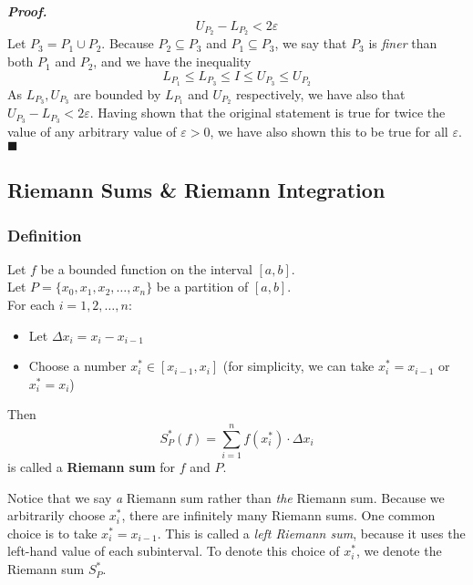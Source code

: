 \documentclass[10pt]{article}
\newenvironment{definition}[1][]{\begin{tcolorbox}[colframe=_orange,colback=_orange2,title=Definition. \ifthenelse{\isempty{#1}}{}{(#1)}
]}{\end{tcolorbox}}
\newenvironment{proof}{\par\textit{\textbf{Proof.}}}{\hfill$\blacksquare$}
\begin{document}
\begin{proof}
    $$
        U_{P_2}-L_{P_2}<2\varepsilon
    $$
    Let $P_3=P_1\cup P_2$. Because $P_2\subseteq P_3$ and $P_1\subseteq P_3$, we say that $P_3$ is \textit{finer} than both $P_1$ and $P_2$, and we have the inequality
    $$
        L_{P_1}\leq L_{P_3} \leq I \leq U_{P_3} \leq U_{P_2}
    $$
    As $L_{P_3},U_{P_3}$ are bounded by $L_{P_1}$ and $U_{P_2}$ respectively, we have also that $U_{P_3}-L_{P_3}<2\varepsilon$. Having shown that the original statement is true for twice the value of any arbitrary value of $\varepsilon>0$, we have also shown this to be true for all $\varepsilon$.
\end{proof}
\subsection{Riemann Sums \& Riemann Integration}
\subsubsection{Definition}
\begin{definition}
    Let $f$ be a bounded function on the interval $[a,b]$. \\
    Let $P=\{x_0,x_1,x_2,\dots,x_n\}$ be a partition of $[a,b]$. \\
    For each $i=1,2,\dots,n$:
    \begin{itemize}
        \item Let $\Delta x_i=x_i-x_{i-1}$
        \item Choose a number $x_i^*\in[x_{i-1},x_i]$ (for simplicity, we can take $x_i^*=x_{i-1}$ or $x_i^*=x_i$)
    \end{itemize}
    Then
    $$
        S_P^*(f)=\sum_{i=1}^nf(x_i^*)\cdot\Delta x_i
    $$
    is called a \textbf{Riemann sum} for $f$ and $P$.
\end{definition}
Notice that we say \textit{a} Riemann sum rather than \textit{the} Riemann sum. Because we arbitrarily choose $x_i^*$, there are infinitely many Riemann sums. One common choice is to take $x_i^*=x_{i-1}$. This is called a \textit{left Riemann sum}, because it uses the left-hand value of each subinterval. To denote this choice of $x_i^*$, we denote the Riemann sum $S_P^*$.
\end{document}
